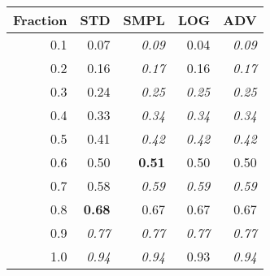 \documentclass{standalone}
\begin{document}
\begin{tabular}{r|rrrr}
      \toprule
      Fraction & STD & SMPL & LOG & ADV\\
      \midrule
      0.1 & 0.07 & \emph{0.09} & 0.04 & \emph{0.09}\\
  0.2 & 0.16 & \emph{0.17} & 0.16 & \emph{0.17}\\
  0.3 & 0.24 & \emph{0.25} & \emph{0.25} & \emph{0.25}\\
  0.4 & 0.33 & \emph{0.34} & \emph{0.34} & \emph{0.34}\\
  0.5 & 0.41 & \emph{0.42} & \emph{0.42} & \emph{0.42}\\
  0.6 & 0.50 & \textbf{0.51} & 0.50 & 0.50\\
  0.7 & 0.58 & \emph{0.59} & \emph{0.59} & \emph{0.59}\\
  0.8 & \textbf{0.68} & 0.67 & 0.67 & 0.67\\
  0.9 & \emph{0.77} & \emph{0.77} & \emph{0.77} & \emph{0.77}\\
  1.0 & \emph{0.94} & \emph{0.94} & 0.93 & \emph{0.94}\\
  \bottomrule
\end{tabular}
\end{document}
